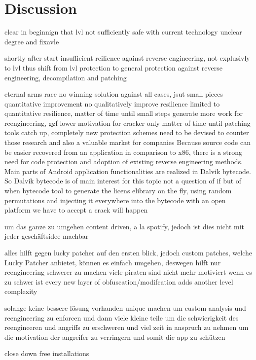 \section{Discussion} \label{section:conclusion-discussion}
clear in beginnign that lvl not sufficiently safe with current technology
unclear degree and fixavle

shortly after start insufficient reilience against reverse engineering, not explusivly to lvl
thus shift from lvl protection to general protection against reverse engineering, decompilation and patching

eternal arms race
no winning solution against all cases, jsut small pieces quantitative improvement
no qualitatively improve resilience
limited to quantitative resilience, matter of time until small steps
generate more work for reengineering, ggf lower motivation for cracker
only matter of time until patching tools catch up, completely new protection schemes need to be devised to counter those
\cite{munteanLicense}
%
research and also a valuable market for companies\newline
Because source code can be easier recovered from an application in comparison
to x86, there is a strong need for code protection and adoption of existing reverse engineering methods. Main parts of Android application functionalities are realized in Dalvik bytecode. So Dalvik bytecode is of main interest for this topic
\cite{schulzLabCourse}
%
not a question of if but of when
bytecode tool to generate the licens elibrary on the fly, using random  permutations and injecting it everywhere into the bytecode
with an open platform we have to accept a crack will happen
\cite{digipomLvl}
%


um das ganze zu umgehen content driven, a la spotify, jedoch ist dies nicht mit jeder geschäftsidee machbar

alles hilft gegen lucky patcher auf den ersten blick, jedoch custom patches, welche Lucky Patcher anbietet\cite{munteanLicense}, können es einfach umgehen,
deswegen hilft nur reengineering schwerer zu machen
viele piraten sind nicht mehr motiviert wenn es zu schwer ist\newline
every new layer of obfuscation/modifcation adds another level complexity\newline

solange keine bessere lösung vorhanden unique machen um custom analysis und reengineering zu enforcen und dann
viele kleine teile um die schwierigkeit des reengineeren und angriffs zu erschweren und viel zeit in anspruch zu nehmen um die motivation der angreifer zu verringern und somit die app zu schützen

close down free installations
